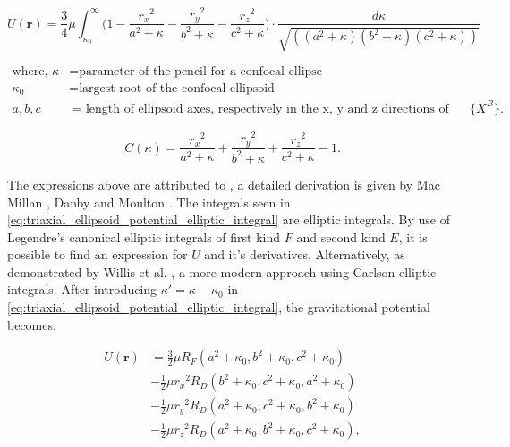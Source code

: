 \begin{equation}
    U(\mathbf{r})=\frac{3}{4}\mu \int_{\kappa_0}^{\infty}\bigg(1-\frac{{r_x}^2}{a^2+\kappa} - \frac{{r_y}^2}{b^2+\kappa} - \frac{{r_z}^2}{c^2+\kappa}\bigg)\cdot{}\frac{d\kappa}{\sqrt{((a^2+\kappa)(b^2+\kappa)(c^2+\kappa))}}
    \label{eq:triaxial_ellipsoid_potential_elliptic_integral}
\end{equation}

\begin{equation*}
    \begin{aligned}
        \textrm{where, }
        \kappa &= \textrm{parameter of the pencil for a confocal ellipse}\\
        \kappa_0 &= \textrm{largest root of the confocal ellipsoid}\\
        a, b, c &= \textrm{length of ellipsoid axes, respectively in the x, y and z directions of the body-fixed frame $\{X^B\}$.}
    \end{aligned}
\end{equation*}

\begin{equation}
    C(\kappa) = \frac{{r_x}^2}{a^2+\kappa} + \frac{{r_y}^2}{b^2+\kappa} + \frac{{r_z}^2}{c^2+\kappa} - 1.
\end{equation}

The expressions above are attributed to \cite{Ivory1809}, a detailed derivation
is given by Mac Millan \cite{MacMillan1958}, Danby \cite{Danby1992} and Moulton
\cite{moulton1970introduction}. The integrals seen in
\autoref{eq:triaxial_ellipsoid_potential_elliptic_integral} are elliptic
integrals. By use of Legendre's canonical elliptic integrals of first kind $F$
and second kind $E$, it is possible to find an expression for $U$ and it's
derivatives. Alternatively, as demonstrated by Willis et al. \cite{Willis2016},
a more modern approach using Carlson elliptic integrals. After introducing
$\kappa'=\kappa-\kappa_0$ in
\autoref{eq:triaxial_ellipsoid_potential_elliptic_integral}, the gravitational
potential becomes:

\begin{equation}
    \begin{aligned}
        U(\mathbf{r}) &= \frac{3}{2}\mu{R_F}(a^2+\kappa_0, b^2 + \kappa_0, c^2 + \kappa_0)\\
        &- \frac{1}{2}\mu{{r_x}^2}R_D(b^2 + \kappa_0, c^2+\kappa_0, a^2+\kappa_0)\\
        &- \frac{1}{2}\mu{{r_y}^2}R_D(a^2 + \kappa_0, c^2+\kappa_0, b^2 + \kappa_0)\\
        &- \frac{1}{2}\mu{{r_z}^2}R_D(a^2 + \kappa_0, b^2 + \kappa_0, c^2 + \kappa_0),
    \end{aligned}
\end{equation}


